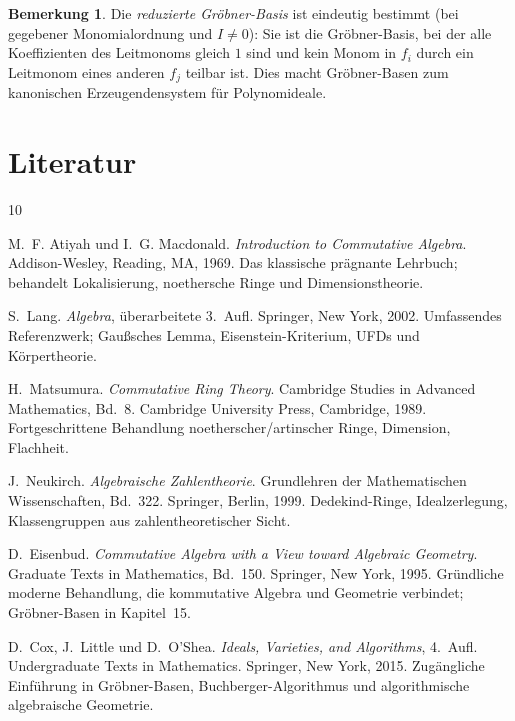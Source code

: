 \documentclass[12pt,a4paper]{amsart}
\theoremstyle{definition}
\newtheorem{remark}[theorem]{Bemerkung}
\theoremstyle{definition}
\begin{document}
\begin{remark}
Die \emph{reduzierte Gröbner-Basis} ist eindeutig bestimmt (bei gegebener Monomialordnung
und $I \neq 0$): Sie ist die Gröbner-Basis, bei der alle Koeffizienten des Leitmonoms
gleich $1$ sind und kein Monom in $f_i$ durch ein Leitmonom eines anderen $f_j$
teilbar ist. Dies macht Gröbner-Basen zum kanonischen Erzeugendensystem für Polynomideale.
\end{remark}

\section{Literatur}

\begin{thebibliography}{10}

M.~F. Atiyah und I.~G. Macdonald.
\newblock \textit{Introduction to Commutative Algebra}.
\newblock Addison-Wesley, Reading, MA, 1969.
\newblock Das klassische prägnante Lehrbuch; behandelt Lokalisierung, noethersche
Ringe und Dimensionstheorie.

S.~Lang.
\newblock \textit{Algebra}, überarbeitete 3.~Aufl.
\newblock Springer, New York, 2002.
\newblock Umfassendes Referenzwerk; Gaußsches Lemma, Eisenstein-Kriterium, UFDs
und Körpertheorie.

H.~Matsumura.
\newblock \textit{Commutative Ring Theory}.
\newblock Cambridge Studies in Advanced Mathematics, Bd.~8.
\newblock Cambridge University Press, Cambridge, 1989.
\newblock Fortgeschrittene Behandlung noetherscher/artinscher Ringe, Dimension, Flachheit.

J.~Neukirch.
\newblock \textit{Algebraische Zahlentheorie}.
\newblock Grundlehren der Mathematischen Wissenschaften, Bd.~322.
\newblock Springer, Berlin, 1999.
\newblock Dedekind-Ringe, Idealzerlegung, Klassengruppen aus zahlentheoretischer Sicht.

D.~Eisenbud.
\newblock \textit{Commutative Algebra with a View toward Algebraic Geometry}.
\newblock Graduate Texts in Mathematics, Bd.~150.
\newblock Springer, New York, 1995.
\newblock Gründliche moderne Behandlung, die kommutative Algebra und Geometrie verbindet;
Gröbner-Basen in Kapitel~15.

D.~Cox, J.~Little und D.~O'Shea.
\newblock \textit{Ideals, Varieties, and Algorithms}, 4.~Aufl.
\newblock Undergraduate Texts in Mathematics.
\newblock Springer, New York, 2015.
\newblock Zugängliche Einführung in Gröbner-Basen, Buchberger-Algorithmus und
algorithmische algebraische Geometrie.


\end{thebibliography}
\end{document}
